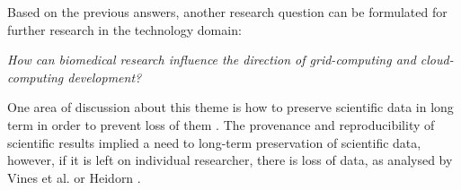 \begin{itemize}



\end{itemize}


Based on the previous answers, another research question can be formulated for further research in the technology domain: 

\emph{How can biomedical research influence the direction of grid-computing and cloud-computing development?}

One area of discussion about this theme is how to preserve scientific data in long term in order to prevent loss of them \cite{Vines2014,P.BryanHeidorn2008}. The provenance and reproducibility of scientific results implied a need to long-term preservation of scientific data, however, if it is left on individual researcher, there is loss of data, as analysed by Vines et al. or Heidorn \cite{Vines2014,P.BryanHeidorn2008}.

